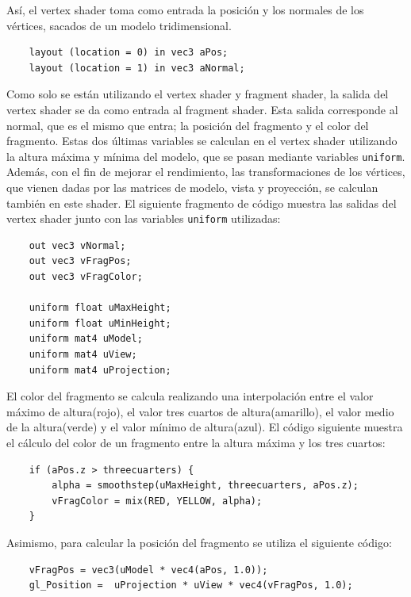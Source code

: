 Así, el vertex shader toma como entrada la posición y los normales de los
vértices, sacados de un modelo tridimensional.

\begin{verbatim}
    layout (location = 0) in vec3 aPos;
    layout (location = 1) in vec3 aNormal;
\end{verbatim}

Como solo se están utilizando el vertex shader y fragment shader, la salida del
vertex shader se da como entrada al fragment shader. Esta salida corresponde al
normal, que es el mismo que entra; la posición del fragmento y el color del
fragmento. Estas dos últimas variables se calculan en el vertex shader
utilizando la altura máxima y mínima del modelo, que se pasan mediante variables
\verb|uniform|.  Además, con el fin de mejorar el rendimiento, las
transformaciones de los vértices, que vienen dadas por las matrices de modelo,
vista y proyección, se calculan también en este shader. El siguiente fragmento
de código muestra las salidas del vertex shader junto con las variables
\verb|uniform| utilizadas:

\begin{verbatim}
    out vec3 vNormal;
    out vec3 vFragPos;
    out vec3 vFragColor;
    
    uniform float uMaxHeight;
    uniform float uMinHeight;
    uniform mat4 uModel;
    uniform mat4 uView;
    uniform mat4 uProjection;
\end{verbatim}

El color del fragmento se calcula realizando una interpolación entre el valor
máximo de altura(rojo), el valor tres cuartos de altura(amarillo), el valor
medio de la altura(verde) y el valor mínimo de altura(azul). El código siguiente
muestra el cálculo del color de un fragmento entre la altura máxima y los tres
cuartos:

\begin{verbatim}
    if (aPos.z > threecuarters) {
        alpha = smoothstep(uMaxHeight, threecuarters, aPos.z);	
        vFragColor = mix(RED, YELLOW, alpha);	
    }
\end{verbatim}

Asimismo, para calcular la posición del fragmento se utiliza el siguiente
código:

\begin{verbatim}		
    vFragPos = vec3(uModel * vec4(aPos, 1.0)); 
    gl_Position =  uProjection * uView * vec4(vFragPos, 1.0);
\end{verbatim}


